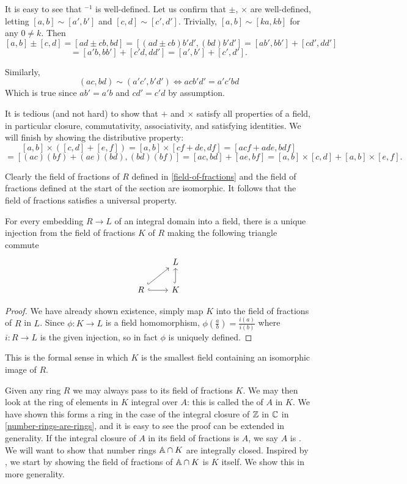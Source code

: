 It is easy to see that $^{-1}$ is well-defined. Let us confirm that $\pm$, $\times$ are well-defined, letting $[a,b]\sim [a',b']$ and $[c,d]\sim [c',d']$. Trivially, $[a,b]\sim [ka,kb]$ for any $0\neq k$. Then
$$[a,b]\pm[c,d]=[ad\pm cb,bd]=[(ad\pm cb)b'd',(bd)b'd']=[ab',bb']+[cd',dd']$$
$$=[a'b,bb']+[c'd,dd']=[a',b']+[c',d'].$$

Similarly, $$(ac,bd)\sim (a'c',b'd')\iff acb'd'=a'c'bd$$
Which is true since $ab'=a'b$ and $cd'=c'd$ by assumption.

It is tedious (and not hard) to show that $+$ and $\times$ satisfy all properties of a field, in particular closure, commutativity, associativity, and satisfying identities. We will finish by showing the distributive property: $$[a,b]\times ([c,d]+[e,f])=[a,b]\times [cf+de,df]=[acf+ade,bdf]$$$$=[(ac)(bf)+(ae)(bd),(bd)(bf)]=[ac,bd]+[ae,bf]=[a,b]\times [c,d]+[a,b]\times[e,f].$$

Clearly the field of fractions of $R$ defined in \cref{field-of-fractions} and the field of fractions defined at the start of the section are isomorphic. It follows that the field of fractions satisfies a universal property.

\begin{prop}
For every embedding $R\rightarrow L$ of an integral domain into a field, there is a unique injection from the field of fractions $K$ of $R$ making the following triangle commute
\[\begin{tikzcd}
                                   & L                 \\
R \arrow[ru, hook] \arrow[r, hook] & K \arrow[u, hook]
\end{tikzcd}\]
\end{prop}
\begin{proof}
We have already shown existence, simply map $K$ into the field of fractions of $R$ in $L$. Since $\phi:K\rightarrow L$ is a field homomorphism, $\phi(\frac{a}{b})=\frac{i(a)}{i(b)}$ where $i:R\rightarrow L$ is the given injection, so in fact $\phi$ is uniquely defined.
\end{proof}

This is the formal sense in which $K$ is the smallest field containing an isomorphic image of $R.$

Given any ring $R$ we may always pass to its field of fractions $K$. We may then look at the ring of elements in $K$ integral over $A$: this is called the  of $A$ in $K$. We have shown this forms a ring in the case of the integral closure of $\mathbb{Z}$ in $\mathbb{C}$ in \cref{number-rings-are-rings}, and it is easy to see the proof can be extended in generality. If the integral closure of $A$ in its field of fractions is $A$, we say $A$ is . We will want to show that number rings $\mathbb{A}\cap K$ are integrally closed. Inspired by \cite{Wright}, we start by showing the field of fractions of $\mathbb{A}\cap K$ is $K$ itself. We show this in more generality.


